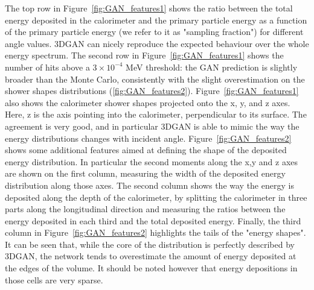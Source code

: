 The top row in Figure~\ref{fig:GAN_features1} shows the ratio between the total energy deposited in the calorimeter and the primary particle energy as a function of the primary particle energy (we refer to it as "sampling fraction") for different angle values. 3DGAN can nicely reproduce the expected behaviour over the whole energy spectrum. The second row in Figure~\ref{fig:GAN_features1} shows the number of hits above a $3 \times 10^{-4}$ MeV threshold: the GAN prediction is slightly broader than the Monte Carlo, consistently with the slight overestimation on the shower shapes distributions (\ref{fig:GAN_features2}).  Figure~\ref{fig:GAN_features1} also shows the calorimeter shower shapes projected onto the x, y, and z axes. Here, z is the axis pointing into the calorimeter, perpendicular to its surface. The agreement is very good, and in particular 3DGAN is able to mimic the way the energy distributions changes with incident angle. 
Figure~\ref{fig:GAN_features2} shows some additional features aimed at defining the shape of the deposited energy distribution. In particular the second moments along the x,y and z axes are shown on the first column, measuring the width of the deposited energy distribution along those axes. The second column shows the way the energy is deposited along the depth of the calorimeter, by splitting the calorimeter in three parts along the longitudinal direction and measuring the ratios between the energy deposited in each third  and the total deposited energy. Finally, the third column in Figure~\ref{fig:GAN_features2} highlights the tails of the "energy shapes". It can be seen that, while the core of the distribution is perfectly described by 3DGAN, the network tends to overestimate the amount of energy deposited at the edges of the volume. It should be noted however that energy depositions in those cells are very sparse. 
\iffalse
